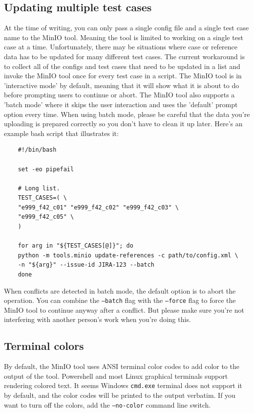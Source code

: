 \documentclass{deltares_memo}
\begin{document}
\subsection{Updating multiple test cases}
At the time of writing, you can only pass a single config file and a single test case name to the MinIO tool. Meaning the tool is limited to working on a single test case at a time. Unfortunately, there may be situations where case or reference data has to be updated for many different test cases. The current workaround is to collect all of the configs and test cases that need to be updated in a list and invoke the MinIO tool once for every test case in a script. The MinIO tool is in 'interactive mode' by default, meaning that it will show what it is about to do before prompting users to continue or abort. The MinIO tool also supports a 'batch mode' where it skips the user interaction and uses the 'default' prompt option every time. When using batch mode, please be careful that the data you're uploading is prepared correctly so you don't have to clean it up later. Here's an example bash script that illustrates it:
\begin{verbatim}
	#!/bin/bash
	
	set -eo pipefail
	
	# Long list.
	TEST_CASES=( \
	"e999_f42_c01" "e999_f42_c02" "e999_f42_c03" \
	"e999_f42_c05" \
	)
	
	for arg in "${TEST_CASES[@]}"; do
	python -m tools.minio update-references -c path/to/config.xml \
	-n "${arg}" --issue-id JIRA-123 --batch
	done
\end{verbatim}
When conflicts are detected in batch mode, the default option is to abort the operation. You can combine the \texttt{---batch} flag with the \texttt{---force} flag to force the MinIO tool to continue anyway after a conflict. But please make sure you're not interfering with another person's work when you're doing this.

\subsection{Terminal colors}
By default, the MinIO tool uses ANSI terminal color codes to add color to the output of the tool. Powershell and most Linux graphical terminals support rendering colored text. It seems Windows \texttt{cmd.exe} terminal does not support it by default, and the color codes will be printed to the output verbatim. If you want to turn off the colors, add the \texttt{---no-color} command line switch.
\end{document}
